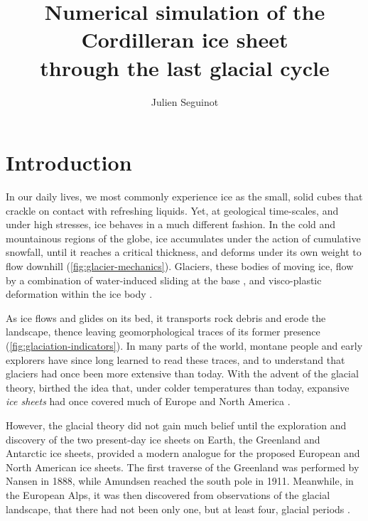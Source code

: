 \documentclass{article}
\title{Numerical simulation of the Cordilleran ice sheet \\
       through the last glacial cycle}
\author{Julien Seguinot}
\begin{document}

\maketitle
\linenumbers
\tableofcontents

\section{Introduction}

In our daily lives, we most commonly experience ice as the small, solid cubes
that crackle on contact with refreshing liquids. Yet, at geological
time-scales, and under high stresses, ice behaves in a much different fashion.
In the cold and mountainous regions of the globe, ice accumulates under the
action of cumulative snowfall, until it reaches a critical thickness, and
deforms under its own weight to flow downhill (\cref{fig:glacier-mechanics}).
Glaciers, these bodies of moving ice, flow by a combination of water-induced
sliding at the base \citep{Saussure.1796}, and visco-plastic deformation within
the ice body \citep{Forbes.1846b}.

As ice flows and glides on its bed, it transports rock debris and erode the
landscape, thence leaving geomorphological traces of its former presence
(\cref{fig:glaciation-indicators}). In many parts of the world, montane people
and early explorers have since long learned to read these traces, and to
understand that glaciers had once been more extensive than today. With the
advent of the glacial theory, birthed the idea that, under colder temperatures
than today, expansive \emph{ice sheets} had once covered much of Europe and
North America \citep{Agassiz.1840}.

However, the glacial theory did not gain much belief until the exploration and
discovery of the two present-day ice sheets on Earth, the Greenland and
Antarctic ice sheets, provided a modern analogue for the proposed European and
North American ice sheets. The first traverse of the Greenland was performed by
Nansen in 1888, while Amundsen reached the south pole in 1911. Meanwhile, in
the European Alps, it was then discovered from observations of the glacial
landscape, that there had not been only one, but at least four, glacial periods
\citep{Penck.Bruckner.1909}.
\end{document}
